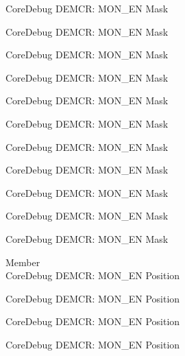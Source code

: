 \begin{DoxyRefList}
\label{deprecated__deprecated000198}%
%
Core\+Debug DEMCR\+: MON\+\_\+\+EN Mask 

\label{deprecated__deprecated000340}%
%
Core\+Debug DEMCR\+: MON\+\_\+\+EN Mask 

\label{deprecated__deprecated000416}%
%
Core\+Debug DEMCR\+: MON\+\_\+\+EN Mask 

\label{deprecated__deprecated000505}%
%
Core\+Debug DEMCR\+: MON\+\_\+\+EN Mask 

\label{deprecated__deprecated000607}%
%
Core\+Debug DEMCR\+: MON\+\_\+\+EN Mask 

\label{deprecated__deprecated000713}%
%
Core\+Debug DEMCR\+: MON\+\_\+\+EN Mask 

\label{deprecated__deprecated000857}%
%
Core\+Debug DEMCR\+: MON\+\_\+\+EN Mask 

\label{deprecated__deprecated000999}%
%
Core\+Debug DEMCR\+: MON\+\_\+\+EN Mask 

\label{deprecated__deprecated001075}%
%
Core\+Debug DEMCR\+: MON\+\_\+\+EN Mask 

\label{deprecated__deprecated001164}%
%
Core\+Debug DEMCR\+: MON\+\_\+\+EN Mask 

\label{deprecated__deprecated001266}%
%
Core\+Debug DEMCR\+: MON\+\_\+\+EN Mask  
\item[Member \doxylink{group___c_m_s_i_s___core_debug_ga802829678f6871863ae9ecf60a10425c}{Core\+Debug\+\_\+\+DEMCR\+\_\+\+MON\+\_\+\+EN\+\_\+\+Pos} ]\hfill \\
\label{deprecated__deprecated000053}%
%
Core\+Debug DEMCR\+: MON\+\_\+\+EN Position 

\label{deprecated__deprecated000197}%
%
Core\+Debug DEMCR\+: MON\+\_\+\+EN Position 

\label{deprecated__deprecated000339}%
%
Core\+Debug DEMCR\+: MON\+\_\+\+EN Position 

\label{deprecated__deprecated000415}%
%
Core\+Debug DEMCR\+: MON\+\_\+\+EN Position 


\end{DoxyRefList}
